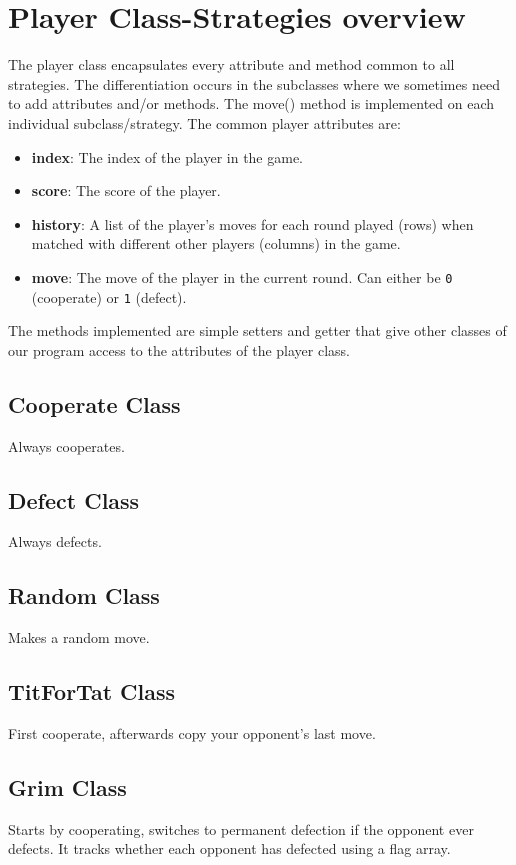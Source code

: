 \documentclass[12pt]{article}
\begin{document}
\section{Player Class-Strategies overview}
The player class encapsulates every attribute and method common to all strategies. The differentiation occurs in the subclasses where we sometimes need to add attributes and/or methods. The move() method is implemented on each individual subclass/strategy. The common player attributes are:
\begin{itemize}
    \item \textbf{index}: The index of the player in the game.
    \item \textbf{score}: The score of the player.
    \item \textbf{history}: A list of the player's moves for each round played (rows) when matched with different other players (columns) in the game.
    \item \textbf{move}: The move of the player in the current round. Can either be \texttt{0} (cooperate) or \texttt{1} (defect).
\end{itemize}
The methods implemented are simple setters and getter that give other classes of our program access to the attributes of the player class.

\subsection{Cooperate Class}
Always cooperates.
\subsection{Defect Class}
Always defects.
\subsection{Random Class}
Makes a random move.
\subsection{TitForTat Class}
First cooperate, afterwards copy your opponent's last move.
\subsection{Grim Class}
Starts by cooperating, switches to permanent defection if the opponent ever defects. It tracks whether each opponent has defected using a flag array.
\end{document}

